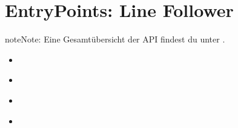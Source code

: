 \documentclass[letterpaper,10pt,english]{sphinxmanual}
\begin{document}
\begin{sphinxVerbatim}[commandchars=\\\{\}]
\end{sphinxVerbatim}

\sphinxstepscope


\chapter{Entry\sphinxhyphen{}Points: Line Follower}
\label{\detokenize{agv_rest_api_linefollower:entry-points-line-follower}}\label{\detokenize{agv_rest_api_linefollower::doc}}
\begin{sphinxadmonition}{note}{Note:}
\sphinxAtStartPar
Eine Gesamtübersicht der API findest du unter {\hyperref[\detokenize{index::doc}]{}}.
\end{sphinxadmonition}

\sphinxAtStartPar
{}
\begin{itemize}
\item {} 
\sphinxAtStartPar
{\hyperref[\detokenize{agv_rest_api_linefollower:get-api-agv-line-follower-settings}]{}}

\item {} 
\sphinxAtStartPar
{\hyperref[\detokenize{agv_rest_api_linefollower:get-api-agv-line-follower-sensors}]{}}

\item {} 
\sphinxAtStartPar
{\hyperref[\detokenize{agv_rest_api_linefollower:post-api-agv-line-follower-enable}]{}}

\item {} 
\sphinxAtStartPar
{\hyperref[\detokenize{agv_rest_api_linefollower:post-api-agv-line-follower-setsampledeltatime}]{}}

\end{itemize}
\end{document}
